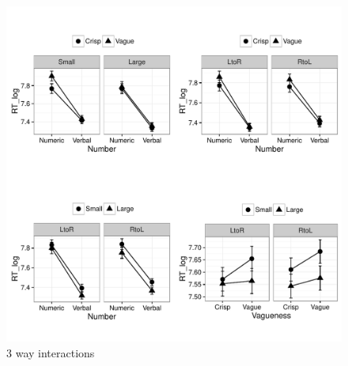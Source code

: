 \documentclass[a4paper,12pt]{article}\usepackage[]{graphicx}\usepackage[]{color}
\makeatletter
\def\maxwidth{ %
  \ifdim\Gin@nat@width>\linewidth
    \linewidth
  \else
    \Gin@nat@width
  \fi
}
\newenvironment{knitrout}{}{} %
\makeatother
\begin{document}
\clearpage

\begin{knitrout}\scriptsize
{}\color{fgcolor}\begin{figure}[hbtp]

{\centering \includegraphics[width=\maxwidth]{figure/graphics-plot3way-1} 

}

\caption[3 way interactions]{3 way interactions}\label{fig:plot3way}
\end{figure}


\end{knitrout}

\clearpage
\end{document}
